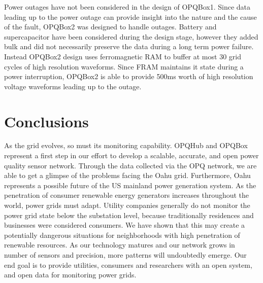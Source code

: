 Power outages have not been considered in the design of OPQBox1. Since data leading up to the power outage can provide insight into the nature and the cause of the fault, OPQBox2 was
designed to handle outages. Battery and supercapacitor have been considered during the design stage, however they added bulk and did not necessarily preserve the data during a long term power failure. Instead OPQBox2 design uses ferromagnetic RAM to buffer at most 30 grid cycles of high resolution waveforms. Since FRAM maintains it state during a power interruption, 
OPQBox2 is able to provide 500ms worth of high resolution voltage waveforms leading up to the outage.

\section{Conclusions}

As the grid evolves, so must its monitoring capability. OPQHub and OPQBox represent a first step in our effort to develop a scalable, accurate, and open power quality sensor network. Through the data collected via the OPQ network, we are able to get a glimpse of the problems facing the Oahu grid. Furthermore, Oahu represents a possible future of the US mainland power generation system. As the penetration of consumer renewable energy generators increases throughout the world, power grids must adapt.  Utility companies generally do not monitor the power grid state below the substation level, because traditionally residences and businesses were considered consumers. We have shown that this may create a potentially dangerous situations for neighborhoods with high penetration of renewable resources. As our technology matures and our network grows in number of sensors and precision, more patterns will undoubtedly emerge. Our end goal is to provide utilities, consumers and researchers with an open system, and open data for monitoring power grids.
